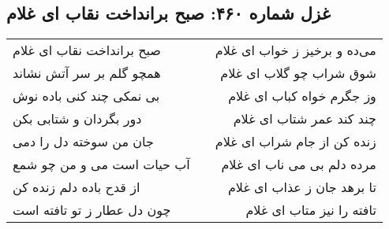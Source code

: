 \begin{center}
\section*{غزل شماره ۴۶۰: صبح برانداخت نقاب ای غلام}
\label{sec:460}
\begin{longtable}{l p{0.5cm} r}
صبح برانداخت نقاب ای غلام
&&
می‌ده و برخیز ز خواب ای غلام
\\
همچو گلم بر سر آتش نشاند
&&
شوق شراب چو گلاب ای غلام
\\
بی نمکی چند کنی باده نوش
&&
وز جگرم خواه کباب ای غلام
\\
دور بگردان و شتابی بکن
&&
چند کند عمر شتاب ای غلام
\\
جان من سوخته دل را دمی
&&
زنده کن از جام شراب ای غلام
\\
آب حیات است می و من چو شمع
&&
مرده دلم بی می ناب ای غلام
\\
از قدح باده دلم زنده کن
&&
تا برهد جان ز عذاب ای غلام
\\
چون دل عطار ز تو تافته است
&&
تافته را نیز متاب ای غلام
\\
\end{longtable}
\end{center}
